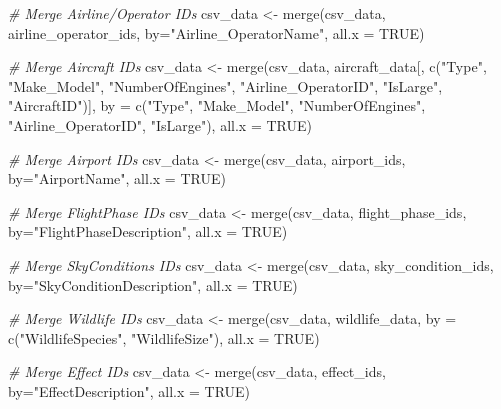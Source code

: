 \documentclass[
]{article}
\newenvironment{Shaded}{\begin{snugshade}}{\end{snugshade}}
\newcommand{\AttributeTok}[1]{\textcolor[rgb]{0.77,0.63,0.00}{#1}}
\newcommand{\CommentTok}[1]{\textcolor[rgb]{0.56,0.35,0.01}{\textit{#1}}}
\newcommand{\ConstantTok}[1]{\textcolor[rgb]{0.00,0.00,0.00}{#1}}
\newcommand{\FunctionTok}[1]{\textcolor[rgb]{0.00,0.00,0.00}{#1}}
\newcommand{\NormalTok}[1]{#1}
\newcommand{\OtherTok}[1]{\textcolor[rgb]{0.56,0.35,0.01}{#1}}
\newcommand{\StringTok}[1]{\textcolor[rgb]{0.31,0.60,0.02}{#1}}
\begin{document}
\begin{Shaded}
\begin{Highlighting}[]
\CommentTok{\# Merge Airline/Operator IDs}
\NormalTok{csv\_data }\OtherTok{\textless{}{-}} \FunctionTok{merge}\NormalTok{(csv\_data, airline\_operator\_ids, }\AttributeTok{by=}\StringTok{"Airline\_OperatorName"}\NormalTok{, }\AttributeTok{all.x =} \ConstantTok{TRUE}\NormalTok{)}

\CommentTok{\# Merge Aircraft IDs}
\NormalTok{csv\_data }\OtherTok{\textless{}{-}} \FunctionTok{merge}\NormalTok{(csv\_data, aircraft\_data[, }\FunctionTok{c}\NormalTok{(}\StringTok{"Type"}\NormalTok{, }\StringTok{"Make\_Model"}\NormalTok{, }\StringTok{"NumberOfEngines"}\NormalTok{, }\StringTok{"Airline\_OperatorID"}\NormalTok{, }\StringTok{"IsLarge"}\NormalTok{, }\StringTok{"AircraftID"}\NormalTok{)],}
                 \AttributeTok{by =} \FunctionTok{c}\NormalTok{(}\StringTok{"Type"}\NormalTok{, }\StringTok{"Make\_Model"}\NormalTok{, }\StringTok{"NumberOfEngines"}\NormalTok{, }\StringTok{"Airline\_OperatorID"}\NormalTok{, }\StringTok{"IsLarge"}\NormalTok{), }\AttributeTok{all.x =} \ConstantTok{TRUE}\NormalTok{)}

\CommentTok{\# Merge Airport IDs}
\NormalTok{csv\_data }\OtherTok{\textless{}{-}} \FunctionTok{merge}\NormalTok{(csv\_data, airport\_ids, }\AttributeTok{by=}\StringTok{"AirportName"}\NormalTok{, }\AttributeTok{all.x =} \ConstantTok{TRUE}\NormalTok{)}

\CommentTok{\# Merge FlightPhase IDs}
\NormalTok{csv\_data }\OtherTok{\textless{}{-}} \FunctionTok{merge}\NormalTok{(csv\_data, flight\_phase\_ids, }\AttributeTok{by=}\StringTok{"FlightPhaseDescription"}\NormalTok{, }\AttributeTok{all.x =} \ConstantTok{TRUE}\NormalTok{)}

\CommentTok{\# Merge SkyConditions IDs}
\NormalTok{csv\_data }\OtherTok{\textless{}{-}} \FunctionTok{merge}\NormalTok{(csv\_data, sky\_condition\_ids, }\AttributeTok{by=}\StringTok{"SkyConditionDescription"}\NormalTok{, }\AttributeTok{all.x =} \ConstantTok{TRUE}\NormalTok{)}

\CommentTok{\# Merge Wildlife IDs}
\NormalTok{csv\_data }\OtherTok{\textless{}{-}} \FunctionTok{merge}\NormalTok{(csv\_data, wildlife\_data, }\AttributeTok{by =} \FunctionTok{c}\NormalTok{(}\StringTok{"WildlifeSpecies"}\NormalTok{, }\StringTok{"WildlifeSize"}\NormalTok{), }\AttributeTok{all.x =} \ConstantTok{TRUE}\NormalTok{)}

\CommentTok{\# Merge Effect IDs}
\NormalTok{csv\_data }\OtherTok{\textless{}{-}} \FunctionTok{merge}\NormalTok{(csv\_data, effect\_ids, }\AttributeTok{by=}\StringTok{"EffectDescription"}\NormalTok{, }\AttributeTok{all.x =} \ConstantTok{TRUE}\NormalTok{)}
\end{Highlighting}
\end{Shaded}
\end{document}
